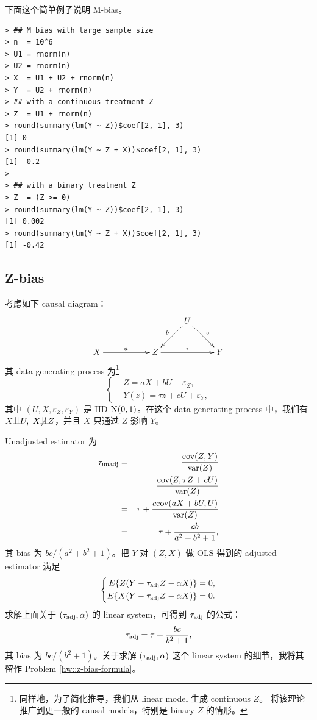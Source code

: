 
 
下面这个简单例子说明 M-bias。

\begin{lstlisting}
> ## M bias with large sample size
> n  = 10^6
> U1 = rnorm(n)
> U2 = rnorm(n)
> X  = U1 + U2 + rnorm(n)
> Y  = U2 + rnorm(n)
> ## with a continuous treatment Z
> Z  = U1 + rnorm(n)
> round(summary(lm(Y ~ Z))$coef[2, 1], 3)
[1] 0
> round(summary(lm(Y ~ Z + X))$coef[2, 1], 3)
[1] -0.2
> 
> ## with a binary treatment Z
> Z  = (Z >= 0)
> round(summary(lm(Y ~ Z))$coef[2, 1], 3)
[1] 0.002
> round(summary(lm(Y ~ Z + X))$coef[2, 1], 3)
[1] -0.42
\end{lstlisting}



\subsection{Z-bias}
\label{sec::z-bias}

 

考虑如下 causal diagram：
$$
\xymatrix{
&&&U \ar[dl]_b \ar[dr]^c \\
X \ar[rr]^a &&Z\ar[rr]^\tau   && Y 
}
$$
其 data-generating process 为\footnote{同样地，为了简化推导，我们从 linear model 生成 continuous $Z$。\citet{ding2017instrumental} 将该理论推广到更一般的 causal models，特别是 binary $Z$ 的情形。
}
$$
\left\{ 
\begin{aligned}
&Z=   aX + bU +   \varepsilon_Z , \\
&Y(z)=   \tau z + cU +  \varepsilon_Y ,
\end{aligned}
\right. 
$$
其中 $(U, X, \varepsilon_Z, \varepsilon_Y) $ 是 IID  $ \N01$。在这个 data-generating process 中，我们有
$X\ind U,$ $X\nind Z$，并且 $X$ 只通过 $Z$ 影响 $Y$。

 
Unadjusted estimator 为
\begin{eqnarray*}
\tau_\textup{unadj} &=& \frac{ \textup{cov}(Z, Y)  }{  \textup{var}(Z) }  \\
&=& \frac{ \textup{cov}(Z, \tau Z + cU)  }{ \textup{var}(Z) }  \\
&=& \tau + \frac{c \textup{cov}(aX + bU, U)  }{  \textup{var}(Z) }  \\
&=& \tau + \frac{c b }{  a^2 + b^2 + 1} ,
\end{eqnarray*}
其 bias 为 $bc/(a^2 + b^2 + 1)$。把 $Y$ 对 $(Z,X)$ 做 OLS 得到的 adjusted estimator 满足
$$
\left\{ 
\begin{aligned}
E\{  Z(Y- \tau_\textup{adj} Z  - \alpha X  )  \} &= 0,\\
E\{  X(Y - \tau_\textup{adj} Z - \alpha X)  \} &= 0.
\end{aligned}
\right. 
$$
求解上面关于 $(\tau_\textup{adj}, \alpha)$ 的 linear system，可得到 $  \tau_\textup{adj}$ 的公式：
\begin{equation}
\label{eq::zbias-result}
  \tau_\textup{adj}  = \tau +  \frac{    bc }{   b^2+1 },
\end{equation}
其 bias 为 $bc/(b^2+1)$。关于求解 $(\tau_\textup{adj}, \alpha)$ 这个 linear system 的细节，我将其留作 Problem \cref{hw::z-bias-formula}。

